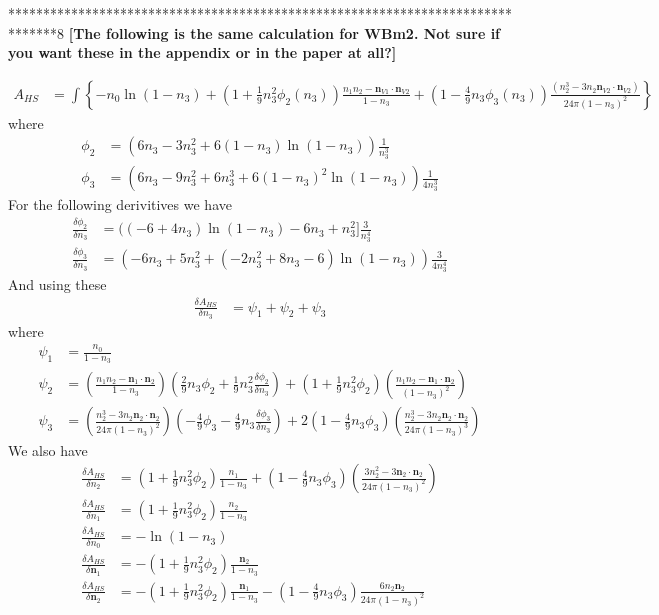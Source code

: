 \documentclass[letterpaper,twocolumn,amsmath,amssymb,jcp,10pt,aip]{revtex4-1}
\newcommand{\red}[1]{{\bf \color{red} #1}}
\newcommand{\fixme}[1]{\red{[#1]}}
\begin{document}
{*******************************************************************************8
\fixme{The following is the same calculation for WBm2.  Not sure if you want these in the appendix or in the paper at all?}
 
\begin{align} 
A_{HS} &= \int \left\{
    -n_0 \ln\left(1 - n_3\right)
    + \left(1 + \frac{1}{9}n_3^2 \phi_2(n_3)\right)   \frac{n_1 n_2 - \mathbf{n}_{V1} \cdot\mathbf{n}_{V2}}{1-n_3}
    + (1 - \frac{4}{9}n_3\phi_3(n_3))\frac{(n_2^3 - 3 n_2 \mathbf{n}_{V2} \cdot \mathbf{n}_{V2})}{24\pi (1-n_3)^2}
    \right\}
\end{align}
 where
 \begin{align}
   \phi_2 &= (6n_3 - 3n_3^2 + 6(1-n_3)\ln(1-n_3))\frac{1}{n_3^3}\\
   \phi_3 &= (6n_3 - 9n_3^2 + 6n_3^3 + 6(1-n_3)^2 \ln(1-n_3))\frac{1}{4n_3^3}
 \end{align}
For the following derivitives we have
\begin{align}
   \frac{\delta \phi_2}{\delta n_3} &= ((-6+4n_3)\ln(1-n_3) - 6n_3 + n_3^2]\frac{3}{n_3^4}\\
   \frac{\delta \phi_3}{\delta n_3} &= (-6n_3 + 5n_3^2 + (-2n_3^2 + 8n_3 -6)\ln(1-n_3))\frac{3}{4n_3^4}
 \end{align}
And using these
\begin{align}
  \frac{\delta A_{HS}}{\delta n_3} &= \psi _1 + \psi _2 + \psi _3
\end{align}
where
\begin{align}
  \psi_1 &= \frac{n_0}{1-n_3}\\
  \psi_2 &= (\frac{n_1n_2 - \mathbf{n}_1\cdot \mathbf{n}_2}{1-n_3})(\frac{2}{9}n_3\phi_2 + \frac{1}{9}n_3^2\frac{\delta \phi_2}{\delta n_3}) + (1 + \frac{1}{9}n_3^2\phi_2)(\frac{n_1n_2 - \mathbf{n}_1\cdot \mathbf{n}_2}{(1-n_3)^2})\\
  \psi_3 &= (\frac{n_2^3 - 3n_2\mathbf{n}_2 \cdot \mathbf{n}_2}{24\pi(1-n_3)^2})(-\frac{4}{9}\phi_3 - \frac{4}{9}n_3\frac{\delta \phi_3}{\delta n_3}) + 2(1 - \frac{4}{9}n_3\phi_3)(\frac{n_2^3 - 3n_2\mathbf{n}_2 \cdot \mathbf{n}_2}{24\pi(1-n_3)^3}) 
\end{align}
We also have
\begin{align}
  \frac{\delta A_{HS}}{\delta n_2} &= (1 + \frac{1}{9}n_3^2\phi_2)\frac{n_1}{1-n_3} + (1 - \frac{4}{9}n_3\phi_3)(\frac{3n_2^2 - 3\mathbf{n}_2 \cdot \mathbf{n}_2}{24\pi(1 - n_3)^2})\\
  \frac{\delta A_{HS}}{\delta n_1} &= (1 + \frac{1}{9}n_3^2\phi_2)\frac{n_2}{1 - n_3}\\
  \frac{\delta A_{HS}}{\delta n_0} &= -\ln(1 - n_3)\\
  \frac{\delta A_{HS}}{\delta \mathbf{n}_1} &= -(1 + \frac{1}{9}n_3^2 \phi_2)\frac{\mathbf{n}_2}{1 - n_3}\\
  \frac{\delta A_{HS}}{\delta \mathbf{n}_2} &= -(1 + \frac{1}{9}n_3^2\phi_2)\frac{\mathbf{n}_1}{1 - n_3} 
  - (1 - \frac{4}{9}n_3\phi_3)\frac{6n_2\mathbf{n}_2}{24\pi(1 - n_3)^2}
\end{align}




}
\end{document}
